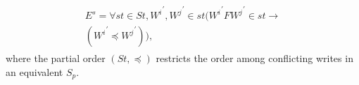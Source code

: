 \documentclass{sig-alternate-05-2015}
\begin{document}
  \begin{align}\label{eqn:MW}
\begin{split}
E^{s} = \forall \mathit{st} \in \mathit{St}, {W^i}^{'}, {W^j}^{'} \in \mathit{st} \big( {W^i}^{'} F {W^j}^{'} \in \mathit{st}  \rightarrow \\ \left( {W^i}^{'} \preccurlyeq {W^j}^{'} \right) \big), %
\end{split}
  \end{align} where the partial order $\left( \mathit{St}, \preccurlyeq \right)$ restricts the order among conflicting writes  in an equivalent $S_p$.
\end{document}
